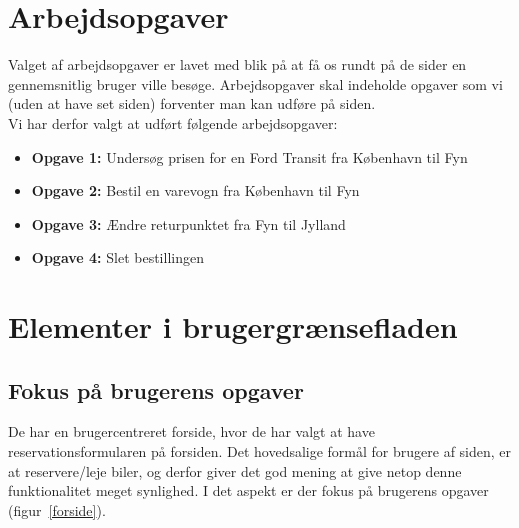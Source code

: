 \documentclass[a4paper]{article}
\begin{document}
\section{Arbejdsopgaver}

Valget af arbejdsopgaver er lavet med blik på at få os rundt på de sider en
gennemsnitlig bruger ville besøge. Arbejdsopgaver skal indeholde opgaver som vi 
(uden at have set siden) forventer man kan udføre på siden.\\
Vi har derfor valgt at udført følgende arbejdsopgaver:

\begin{itemize}
\item{\textbf{Opgave 1:}}
    Undersøg prisen for en Ford Transit fra København til Fyn
\item{\textbf{Opgave 2:}}
    Bestil en varevogn fra København til Fyn
\item{\textbf{Opgave 3:}}
    Ændre returpunktet fra Fyn til Jylland
\item{\textbf{Opgave 4:}}
    Slet bestillingen
\end{itemize}

\section{Elementer i brugergrænsefladen}
\subsection{Fokus på brugerens opgaver}
De har en brugercentreret forside, hvor de har valgt at have
reservationsformularen på forsiden. Det hovedsalige formål for brugere af siden,
er at reservere/leje biler, og derfor giver det god mening at give netop denne
funktionalitet meget synlighed. I det aspekt er der fokus på brugerens opgaver
(figur~\ref{forside}).
\end{document}
